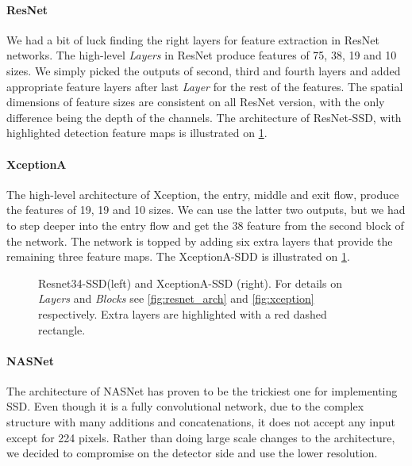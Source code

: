 \paragraph{ResNet} We had a bit of luck finding the right layers for feature extraction in ResNet networks. The high-level \textit{Layers} in ResNet produce features of 75, 38, 19 and 10 sizes. We simply picked the outputs of second, third and fourth layers and added appropriate feature layers after last \textit{Layer} for the rest of the features. The spatial dimensions of feature sizes are consistent on all ResNet version, with the only difference being the depth of the channels. The architecture of ResNet-SSD, with highlighted detection feature maps is illustrated on \cref{fig:resnet_xception_SSD}.

\paragraph{XceptionA} The high-level architecture of Xception, the entry, middle and exit flow, produce the features of 19, 19 and 10 sizes. We can use the latter two outputs, but we had to step deeper into the entry flow and get the 38 feature from the second block of the network. The network is topped by adding six extra layers that provide the remaining three feature maps. The XceptionA-SDD is illustrated on \cref{fig:resnet_xception_SSD}.


\begin{figure}
    \centering
    \resnetSSD
    \caption[Resnet34-SSD and Xception-SSD]%
    {Resnet34-SSD(left) and XceptionA-SSD (right). For details on \textit{Layers} and \textit{Blocks} see \cref{fig:resnet_arch} and \cref{fig:xception} respectively. Extra layers are highlighted with a red dashed rectangle.}

    \label{fig:resnet_xception_SSD}
\end{figure}

\paragraph{NASNet} The architecture of NASNet has proven to be the trickiest one for implementing SSD. Even though it is a fully convolutional network, due to the complex structure with many additions and concatenations, it does not accept any input except for 224 pixels. Rather than doing large scale changes to the architecture, we decided to compromise on the detector side and use the lower resolution. 

